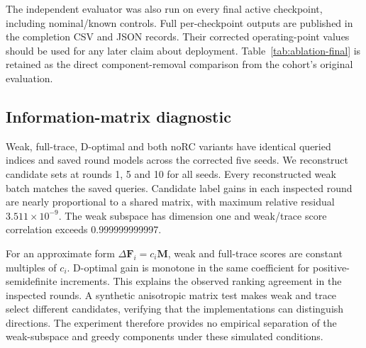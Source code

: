 \documentclass[conference]{IEEEtran}
\newcommand{\F}{\mathbf{F}}
\begin{document}
The independent evaluator was also run on every final active checkpoint, including nominal/known controls. Full per-checkpoint outputs are published in the completion CSV and JSON records. Their corrected operating-point values should be used for any later claim about deployment. Table~\ref{tab:ablation-final} is retained as the direct component-removal comparison from the cohort's original evaluation.

\subsection{Information-matrix diagnostic}
Weak, full-trace, D-optimal and both noRC variants have identical queried indices and saved round models across the corrected five seeds. We reconstruct candidate sets at rounds 1, 5 and 10 for all seeds. Every reconstructed weak batch matches the saved queries. Candidate label gains in each inspected round are nearly proportional to a shared matrix, with maximum relative residual $3.511\times10^{-9}$. The weak subspace has dimension one and weak/trace score correlation exceeds 0.999999999997.

For an approximate form $\Delta\F_i=c_i\mathbf M$, weak and full-trace scores are constant multiples of $c_i$. D-optimal gain is monotone in the same coefficient for positive-semidefinite increments. This explains the observed ranking agreement in the inspected rounds. A synthetic anisotropic matrix test makes weak and trace select different candidates, verifying that the implementations can distinguish directions. The experiment therefore provides no empirical separation of the weak-subspace and greedy components under these simulated conditions.
\end{document}
